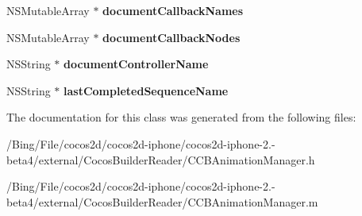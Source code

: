 \begin{DoxyCompactItemize}
\item 
\hypertarget{interface_c_c_b_animation_manager_aa42da34e25f0dfc64299ceb6a89804cd}{N\-S\-Mutable\-Array $\ast$ {\bfseries document\-Callback\-Names}}\label{interface_c_c_b_animation_manager_aa42da34e25f0dfc64299ceb6a89804cd}

\item 
\hypertarget{interface_c_c_b_animation_manager_a6410825ef8cab0738b1a434832da96ec}{N\-S\-Mutable\-Array $\ast$ {\bfseries document\-Callback\-Nodes}}\label{interface_c_c_b_animation_manager_a6410825ef8cab0738b1a434832da96ec}

\item 
\hypertarget{interface_c_c_b_animation_manager_abd6b8e20a679630977b9810760d27b33}{N\-S\-String $\ast$ {\bfseries document\-Controller\-Name}}\label{interface_c_c_b_animation_manager_abd6b8e20a679630977b9810760d27b33}

\item 
\hypertarget{interface_c_c_b_animation_manager_a800e66c91144338b869a5bd77191c67c}{N\-S\-String $\ast$ {\bfseries last\-Completed\-Sequence\-Name}}\label{interface_c_c_b_animation_manager_a800e66c91144338b869a5bd77191c67c}

\end{DoxyCompactItemize}


The documentation for this class was generated from the following files\-:\begin{DoxyCompactItemize}
\item 
/\-Bing/\-File/cocos2d/cocos2d-\/iphone/cocos2d-\/iphone-\/2.-\/beta4/external/\-Cocos\-Builder\-Reader/C\-C\-B\-Animation\-Manager.\-h\item 
/\-Bing/\-File/cocos2d/cocos2d-\/iphone/cocos2d-\/iphone-\/2.-\/beta4/external/\-Cocos\-Builder\-Reader/C\-C\-B\-Animation\-Manager.\-m\end{DoxyCompactItemize}
